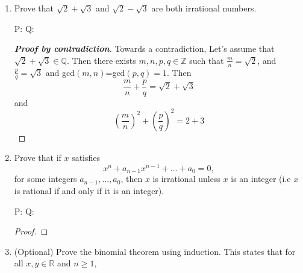 \documentclass{article} %
\theoremstyle{plain}
\newtheorem*{theorem*}{Theorem}
\theoremstyle{definition}
\theoremstyle{case}
\begin{document}
\begin{enumerate}[label={\fbox{\textbf{Exercise \#\arabic* :}}}]
\begin{theorem*} Suppose $n$ is an integer. If $n^2$ is divisible by $3$, then $n$ is divisible by $3$. 

\end{theorem*}
\emph{(Hint: if $n$ is not divisible by $3$, then $n=3k+1$ or $n=3k+2$ for some integer $k$.)}

P: $ 3 | n^2 $\\
Q:  $ 3 | n $

\renewcommand\qedsymbol{\Lightning}
\begin{proof}[\textbf{Proof by contradiction}]  Towards a contradiction,
  let's assume that \[ 3 \not| n^2 \]
  Then, for some integer $k$, $n^2 = 3k + 1$ or $n^2 = 3k + 2$. (DO I
  NEED THIS?  SHOULD I BE USING THIS FOR A DIFFERENT PROOF TECHNIQUE?)

  We also know that $3 | n$, so there is some integer, $m$ such that
  $n = 3m$. Multiplying the left side by n, and the right side by $3m$
  we get $n^2 = 3^2m^2 = 3(3m^3)$, which is surely divisble by 3.  But
  we said that  $ 3 \not| n^2 $!

\end{proof} 
\renewcommand\qedsymbol{$\square$}

\newpage
\item Prove that $\sqrt{2}+\sqrt{3}$ and $\sqrt{2}-\sqrt{3}$ are both
  irrational numbers.

P: 
Q:

\renewcommand\qedsymbol{\Lightning}
\begin{proof}[\textbf{Proof by contradiction}]  Towards a contradiction,
  Let's assume that $\sqrt{2}+\sqrt{3} \in \mathbb{Q}$.
  Then there exists $m,n,p,q \in \mathbb{Z} $ such that $\frac{m}{n}
  = \sqrt{2}$, and $\frac{p}{q} = \sqrt{3}$ and gcd$(m,n)$=gcd$(p,q) =1$.
  Then 
  \[ \frac{m}{n} + \frac{p}{q} = \sqrt{2}+\sqrt{3} \]
  and
  \[ \left( \frac{m}{n} \right)^2 + \left( \frac{p}{q} \right)^2 = 2+3 \]
\end{proof} 
\renewcommand\qedsymbol{$\square$}
\newpage
\item Prove that if $x$ satisfies 
  \[ x^n+a_{n-1}x^{n-1}+...+a_{0}=0, \]
  for some integers $a_{n-1},...,a_0$, then $x$ is irrational unless $x$ is an integer (i.e $x$ is rational if and only if it is an integer).

P: 
Q:

\begin{proof}
\end{proof} 

\newpage
\item (Optional) Prove the binomial theorem using induction. This states that for all $x,y \in \mathbb{R}$ and $n\geq 1$,



\end{enumerate}
\end{document}
